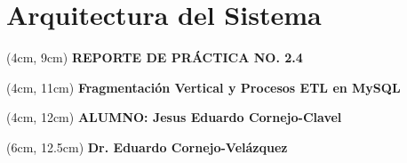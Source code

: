 \section{Arquitectura del Sistema}
\BgThispage
\-
\begin{textblock*}{15cm}(4cm, 9cm)
    {\fontsize{30pt}{16pt}\selectfont
    \textcolor{rojo}{\textbf{REPORTE DE PRÁCTICA NO. 2.4}}
    }
\end{textblock*}
\begin{textblock*}{15cm}(4cm, 11cm)
    {\fontsize{15pt}{16pt}\selectfont
    \textcolor{rojo}{\textbf{Fragmentación Vertical y Procesos ETL en MySQL}}
    }
\end{textblock*}
\begin{textblock*}{15cm}(4cm, 12cm)
    {\fontsize{13pt}{16pt}\selectfont
    \textcolor{rojo}{\textbf{ALUMNO: Jesus Eduardo Cornejo-Clavel}}
    }
\end{textblock*}
\begin{textblock*}{15cm}(6cm, 12.5cm)
    {\fontsize{11pt}{16pt}\selectfont
    \textcolor{rojo}{\textbf{Dr. Eduardo Cornejo-Velázquez}}
    }
\end{textblock*}

\newpage
\tableofcontents


